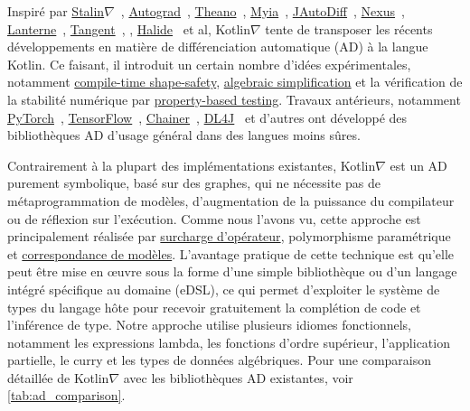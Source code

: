 Inspiré par \href{https://github.com/Functional-AutoDiff/STALINGRAD}{Stalin$\nabla$}~\citep{pearlmutter2008using}, \href{https://github.com/HIPS/autograd/}{Autograd}~\citep{maclaurin2015autograd, maclaurin2016phd}, \href{http://deeplearning. net/software/theano/}{Theano}~\citep{bergstra2010theano}, \href{https://github.com/mila-iqia/myia}{Myia}~\citep{breuleux2017automatique, vanmerrienboer2018ad}, \href{https://github. com/uniker9/JAutoDiff/}{JAutoDiff}~\citep{nureki2012jautodiff}, \href{https://tongfei.me/nexus/}{Nexus}~\citep{chen2017typesafe}, \href{https://feiwang3311.github.io/Lantern/}{Lanterne}~\citep{wang2018demystifying}, \href{https://github. com/google/tangent}{Tangent}~\citep{van2018tangent}, \citet{elliott2018simple}, \href{https://people.csail.mit.edu/tzumao/gradient_halide/}{Halide}~\citep{li2018halide} et al, Kotlin$\nabla$ tente de transposer les récents développements en matière de différenciation automatique (AD) à la langue Kotlin. Ce faisant, il introduit un certain nombre d'idées expérimentales, notamment \hyperref[sec:shape-safety]{compile-time shape-safety}, \hyperref[sec:multiple-dispatch]{algebraic simplification} et la vérification de la stabilité numérique par \hyperref[sec:testing]{property-based testing}. Travaux antérieurs, notamment \href{https://pytorch.org/}{PyTorch}~\citep{paszke2019pytorch}, \href{https://www.tensorflow.org/}{TensorFlow}~\citep{abadi2016tensorflow}, \href{https://chainer. org/}{Chainer}~\citep{chainer}, \href{https://deeplearning4j.org/}{DL4J}~\cite{team2016dl4j} et d'autres ont développé des bibliothèques AD d'usage général dans des langues moins sûres.

Contrairement à la plupart des implémentations existantes, Kotlin$\nabla$ est un AD purement symbolique, basé sur des graphes, qui ne nécessite pas de métaprogrammation de modèles, d'augmentation de la puissance du compilateur ou de réflexion sur l'exécution. Comme nous l'avons vu, cette approche est principalement réalisée par \hyperref[sec:operator-overloading]{surcharge d'opérateur}, polymorphisme paramétrique et \hyperref[sec:adts]{correspondance de modèles}. L'avantage pratique de cette technique est qu'elle peut être mise en œuvre sous la forme d'une simple bibliothèque ou d'un langage intégré spécifique au domaine (eDSL), ce qui permet d'exploiter le système de types du langage hôte pour recevoir gratuitement la complétion de code et l'inférence de type. Notre approche utilise plusieurs idiomes fonctionnels, notamment les expressions lambda, les fonctions d'ordre supérieur, l'application partielle, le curry et les types de données algébriques. Pour une comparaison détaillée de Kotlin$\nabla$ avec les bibliothèques AD existantes, voir \autoref{tab:ad_comparison}.\\

